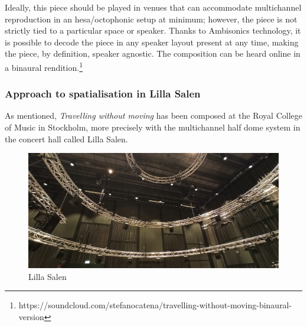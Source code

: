 \documentclass{article}
\begin{document}
        Ideally, this piece should be played in venues that can accommodate multichannel reproduction in an hesa/octophonic setup at minimum; however, the piece is not strictly tied to a particular space or speaker. Thanks to Ambisonics technology, it is possible to decode the piece in any speaker layout present at any time, making the piece, by definition, speaker agnostic.
        The composition can be heard online in a binaural rendition.\footnote{https://soundcloud.com/stefanocatena/travelling-without-moving-binaural-version}
	
	\subsubsection{Approach to spatialisation in Lilla Salen}
	\label{subsec:approach}

        As mentioned, \textit{Travelling without moving} has been composed at the Royal College of Music in Stockholm, more precisely with the multichannel half dome system in the concert hall called Lilla Salen.

        \begin{figure}[h]
		\centering
		\includegraphics[width=1\columnwidth]{SMC_2024_Paper/lillaSalen.jpg}
		\caption{Lilla Salen\label{fig:lilla}}
	\end{figure}  
        
\end{document}
